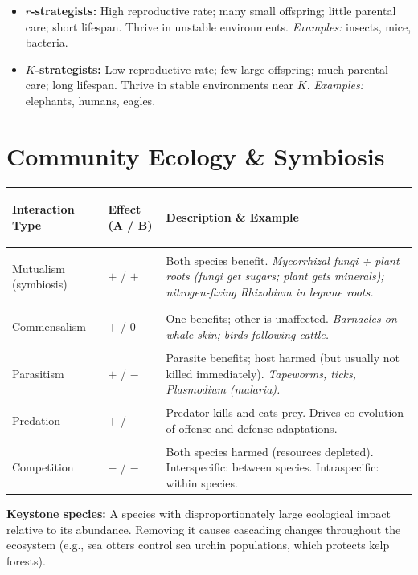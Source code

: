 \documentclass[11pt, letterpaper]{article}
\begin{document}
\begin{itemize}[noitemsep]
  \item \textbf{$r$-strategists:} High reproductive rate; many small offspring; little parental care; short lifespan. Thrive in unstable environments. \textit{Examples:} insects, mice, bacteria.
  \item \textbf{$K$-strategists:} Low reproductive rate; few large offspring; much parental care; long lifespan. Thrive in stable environments near $K$. \textit{Examples:} elephants, humans, eagles.
\end{itemize}

\section*{Community Ecology \& Symbiosis}

\noindent
{\renewcommand{\arraystretch}{1.6}
\begin{tabularx}{\textwidth}{>{\bfseries\raggedright\arraybackslash}p{3.5cm}
                              >{\centering\arraybackslash}p{2cm}
                              >{\raggedright\arraybackslash}X}
\toprule
\rowcolor{tableheader}
\textbf{Interaction Type} & \textbf{Effect (A / B)} & \textbf{Description \& Example} \\
\midrule
\rowcolor{rowA}  Mutualism (symbiosis)  & $+$ / $+$ & Both species benefit. \textit{Mycorrhizal fungi + plant roots (fungi get sugars; plant gets minerals); nitrogen-fixing Rhizobium in legume roots.} \\
\rowcolor{rowB}  Commensalism          & $+$ / 0   & One benefits; other is unaffected. \textit{Barnacles on whale skin; birds following cattle.} \\
\rowcolor{rowA}  Parasitism            & $+$ / $-$ & Parasite benefits; host harmed (but usually not killed immediately). \textit{Tapeworms, ticks, Plasmodium (malaria).} \\
\rowcolor{rowB}  Predation             & $+$ / $-$ & Predator kills and eats prey. Drives co-evolution of offense and defense adaptations. \\
\rowcolor{rowA}  Competition           & $-$ / $-$ & Both species harmed (resources depleted). Interspecific: between species. Intraspecific: within species. \\
\bottomrule
\end{tabularx}}

\textbf{Keystone species:} A species with disproportionately large ecological impact relative
to its abundance. Removing it causes cascading changes throughout the ecosystem
(e.g., sea otters control sea urchin populations, which protects kelp forests).
\end{document}

